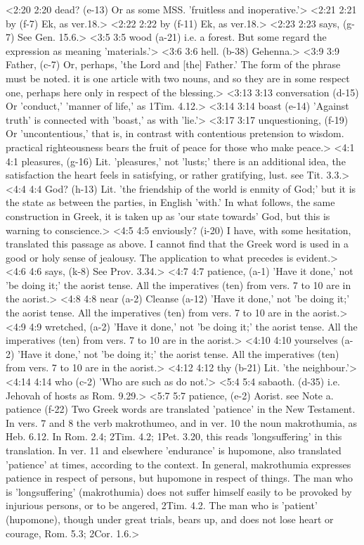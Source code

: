 <2:20 2:20  dead? (e-13)  Or as some MSS. 'fruitless and inoperative.'>
<2:21 2:21  by (f-7)  Ek, as ver.18.>
<2:22 2:22  by (f-11)  Ek, as ver.18.>
<2:23 2:23  says, (g-7)  See Gen. 15.6.>
<3:5 3:5  wood (a-21)  i.e. a forest. But some regard the expression as meaning  'materials.'>
<3:6 3:6  hell. (b-38)  Gehenna.>
<3:9 3:9  Father, (c-7)  Or, perhaps, 'the Lord and [the] Father.' The form of the  phrase must be noted. it is one article with two nouns, and so  they are in some respect one, perhaps here only in respect of  the blessing.>
<3:13 3:13  conversation (d-15)  Or 'conduct,' 'manner of life,' as 1Tim. 4.12.>
<3:14 3:14  boast (e-14)  'Against truth' is connected with 'boast,' as with 'lie.'>
<3:17 3:17  unquestioning, (f-19)  Or 'uncontentious,' that is, in contrast with contentious  pretension to wisdom. practical righteousness bears the fruit  of peace for those who make peace.>
<4:1 4:1  pleasures, (g-16)  Lit. 'pleasures,' not 'lusts;' there is an additional idea,  the satisfaction the heart feels in satisfying, or rather  gratifying, lust. see Tit. 3.3.>
<4:4 4:4  God? (h-13)  Lit. 'the friendship of the world is enmity of God;' but it  is the state as between the parties, in English 'with.' In what  follows, the same construction in Greek, it is taken up as 'our  state towards' God, but this is warning to conscience.>
<4:5 4:5  enviously? (i-20)  I have, with some hesitation, translated this passage as  above. I cannot find that the Greek word is used in a good or  holy sense of jealousy. The application to what precedes is  evident.>
<4:6 4:6  says, (k-8)  See Prov. 3.34.>
<4:7 4:7  patience, (a-1)  'Have it done,' not 'be doing it;' the aorist tense. All the  imperatives (ten) from vers. 7 to 10 are in the aorist.>
<4:8 4:8  near (a-2)  Cleanse (a-12)
  'Have it done,' not 'be doing it;' the aorist tense. All the  imperatives (ten) from vers. 7 to 10 are in the aorist.>
<4:9 4:9  wretched, (a-2)  'Have it done,' not 'be doing it;' the aorist tense. All the  imperatives (ten) from vers. 7 to 10 are in the aorist.>
<4:10 4:10  yourselves (a-2)  'Have it done,' not 'be doing it;' the aorist tense. All the  imperatives (ten) from vers. 7 to 10 are in the aorist.>
<4:12 4:12  thy (b-21)  Lit. 'the neighbour.'>
<4:14 4:14  who (c-2)  'Who are such as do not.'>
<5:4 5:4  sabaoth. (d-35)  i.e. Jehovah of hosts as Rom. 9.29.>
<5:7 5:7  patience, (e-2)  Aorist. see Note a.
  patience (f-22)  Two Greek words are translated 'patience' in the New  Testament. In vers. 7 and 8 the verb makrothumeo, and in ver.  10 the noun makrothumia, as Heb. 6.12. In Rom. 2.4; 2Tim.  4.2; 1Pet. 3.20, this reads 'longsuffering' in this  translation. In ver. 11 and elsewhere 'endurance' is  hupomone, also translated 'patience' at times, according to  the context. In general, makrothumia expresses patience in  respect of persons, but hupomone in respect of things. The  man who is 'longsuffering' (makrothumia) does not suffer  himself easily to be provoked by injurious persons, or to be  angered, 2Tim. 4.2. The man who is 'patient' (hupomone),  though under great trials, bears up, and does not lose heart or  courage, Rom. 5.3; 2Cor. 1.6.>
